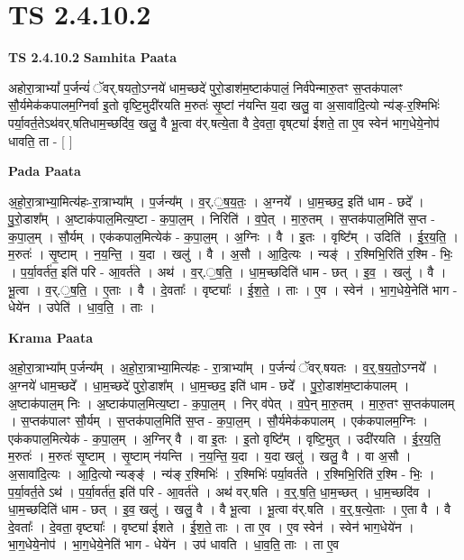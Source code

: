 \documentclass[17pt]{extarticle}
\begin{document}
\section{ TS 2.4.10.2 }

\textbf{TS 2.4.10.2 } \newline
\textbf{Samhita Paata} \newline

अहोरा॒त्राभ्यां᳚ प॒र्जन्यं॑ ॅवर्.षयतो॒ऽग्नये॑ धाम॒च्छदे॑ पुरो॒डाश॑म॒ष्टाक॑पालं॒ निर्व॑पेन्मारु॒तꣳ स॒प्तक॑पालꣳ सौ॒र्यमेक॑कपालम॒ग्निर्वा इ॒तो वृष्टि॒मुदी॑रयति म॒रुतः॑ सृ॒ष्टां न॑यन्ति य॒दा खलु॒ वा अ॒सावा॑दि॒त्यो न्य॑ङ्-र॒श्मिभिः॑ पर्या॒वर्त॒तेऽथ॑वर्.षतिधाम॒च्छदि॑व॒ खलु॒ वै भू॒त्वा व॑र्.षत्ये॒ता वै दे॒वता॒ वृष्‌ट्या॑ ईशते॒ ता ए॒व स्वेन॑ भाग॒धेये॒नोप॑ धावति॒ ता - [  ] \newline

\textbf{Pada Paata} \newline

अ॒हो॒रा॒त्राभ्या॒मित्य॑हः-रा॒त्राभ्या᳚म् ।  प॒र्जन्य᳚म् । व॒र्.॒ष॒य॒तः॒ । अ॒ग्नये᳚ । धा॒म॒च्छद॒ इति॑ धाम - छदे᳚ । पु॒रो॒डाश᳚म् । अ॒ष्टाक॑पाल॒मित्य॒ष्टा - क॒पा॒ल॒म् । निरिति॑ । व॒पे॒त् । मा॒रु॒तम् । स॒प्तक॑पाल॒मिति॑ स॒प्त - क॒पा॒ल॒म् । सौ॒र्यम् । एक॑कपाल॒मित्येक॑ - क॒पा॒ल॒म् । अ॒ग्निः । वै । इ॒तः । वृष्टि᳚म् । उदिति॑ । ई॒र॒य॒ति॒ । म॒रुतः॑ । सृ॒ष्टाम् । न॒य॒न्ति॒ । य॒दा । खलु॑ । वै । अ॒सौ । आ॒दि॒त्यः । न्यङ्॑ । र॒श्मिभि॒रिति॑ र॒श्मि - भिः॒ । प॒र्या॒वर्त॑त॒ इति॑ परि - आ॒वर्त॑ते । अथ॑ । व॒र्.॒ष॒ति॒ । धा॒म॒च्छदिति॑ धाम - छत् । इ॒व॒ । खलु॑ । वै । भू॒त्वा ।   व॒र्.॒ष॒ति॒ । ए॒ताः । वै । दे॒वताः᳚ । वृष्ट्याः᳚ । ई॒श॒ते॒ । ताः । ए॒व । स्वेन॑ । भा॒ग॒धेये॒नेति॑ भाग - धेये॑न । उपेति॑ । धा॒व॒ति॒ । ताः ।  \newline


\textbf{Krama Paata} \newline

अ॒हो॒रा॒त्राभ्या᳚म् प॒र्जन्य᳚म् । अ॒हो॒रा॒त्राभ्या॒मित्य॑हः - रा॒त्राभ्या᳚म् । प॒र्जन्यं॑ ॅवर्.षयतः । व॒र्॒.ष॒य॒तो॒ऽग्नये᳚ । अ॒ग्नये॑ धाम॒च्छदे᳚ । धा॒म॒च्छदे॑ पुरो॒डाश᳚म् । धा॒म॒च्छद॒ इति॑ धाम - छदे᳚ । पु॒रो॒डाश॑म॒ष्टाक॑पालम् । अ॒ष्टाक॑पाल॒म् निः । अ॒ष्टाक॑पाल॒मित्य॒ष्टा - क॒पा॒ल॒म् । निर् व॑पेत् । व॒पे॒न् मा॒रु॒तम् । मा॒रु॒तꣳ स॒प्तक॑पालम् । स॒प्तक॑पालꣳ सौ॒र्यम् । स॒प्तक॑पाल॒मिति॑ स॒प्त - क॒पा॒ल॒म् । सौ॒र्यमेक॑कपालम् । एक॑कपालम॒ग्निः । एक॑कपाल॒मित्येक॑ - क॒पा॒ल॒म् । अ॒ग्निर् वै । वा इ॒तः । इ॒तो वृष्टि᳚म् । वृष्टि॒मुत् । उदी॑रयति । ई॒र॒य॒ति॒ म॒रुतः॑ । म॒रुतः॑ सृ॒ष्टाम् । सृ॒ष्टाम् न॑यन्ति । न॒य॒न्ति॒ य॒दा । य॒दा खलु॑ । खलु॒ वै । वा अ॒सौ । अ॒सावा॑दि॒त्यः । आ॒दि॒त्यो न्यङ्ङ्॑ । न्य॑ङ् र॒श्मिभिः॑ । र॒श्मिभिः॑ पर्या॒वर्त॑ते । र॒श्मिभि॒रिति॑ र॒श्मि - भिः॒ । प॒र्या॒वर्त॒ते ऽथ॑ । प॒र्या॒वर्त॑त॒ इति॑ परि - आ॒वर्त॑ते । अथ॑ वर्.षति । व॒र्॒.ष॒ति॒ धा॒म॒च्छत् । धा॒म॒च्छदि॑व । धा॒म॒च्छदिति॑ धाम - छत् । इ॒व॒ खलु॑ । खलु॒ वै । वै भू॒त्वा । भू॒त्वा व॑र्.षति । व॒र्॒.ष॒त्ये॒ताः । ए॒ता वै । वै दे॒वताः᳚ । दे॒वता॒ वृष्ट्याः᳚ । वृष्ट्या॑ ईशते । ई॒श॒ते॒ ताः । ता ए॒व । ए॒व स्वेन॑ । स्वेन॑ भाग॒धेये॑न । भा॒ग॒धेये॒नोप॑ । भा॒ग॒धेये॒नेति॑ भाग - धेये॑न । उप॑ धावति । धा॒व॒ति॒ ताः । ता ए॒व \newline
\end{document}
